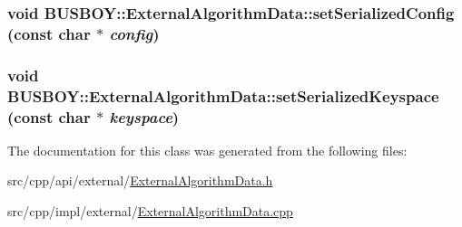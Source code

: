 \label{classBUSBOY_1_1ExternalAlgorithmData_ab6b185983427eafc7309d42b5f28cffe}
\hypertarget{classBUSBOY_1_1ExternalAlgorithmData_a450b04e947f80f3c37b45405b48d5ce4}{
\subsubsection[{setSerializedConfig}]{\setlength{\rightskip}{0pt plus 5cm}void BUSBOY::ExternalAlgorithmData::setSerializedConfig (const char $\ast$ {\em config})}}
\label{classBUSBOY_1_1ExternalAlgorithmData_a450b04e947f80f3c37b45405b48d5ce4}
\hypertarget{classBUSBOY_1_1ExternalAlgorithmData_a33b9b0bcf3fb25fa0b47db2f421ad3c1}{
\subsubsection[{setSerializedKeyspace}]{\setlength{\rightskip}{0pt plus 5cm}void BUSBOY::ExternalAlgorithmData::setSerializedKeyspace (const char $\ast$ {\em keyspace})}}
\label{classBUSBOY_1_1ExternalAlgorithmData_a33b9b0bcf3fb25fa0b47db2f421ad3c1}


The documentation for this class was generated from the following files:\begin{DoxyCompactItemize}
\item 
src/cpp/api/external/\hyperlink{ExternalAlgorithmData_8h}{ExternalAlgorithmData.h}\item 
src/cpp/impl/external/\hyperlink{ExternalAlgorithmData_8cpp}{ExternalAlgorithmData.cpp}\end{DoxyCompactItemize}
